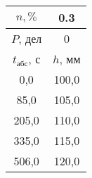 \begin{tabular}[t]{|c|c|}
\hline
$n, \%$ & 0.3 \\
\hline
$P$, дел & 0 \\
\hline
$t_{абс}$, с & $h$, мм \\ 
\hline
0,0 & 100,0 \\ 
85,0 & 105,0 \\ 
205,0 & 110,0 \\ 
335,0 & 115,0 \\ 
506,0 & 120,0 \\ 
\hline
\end{tabular}